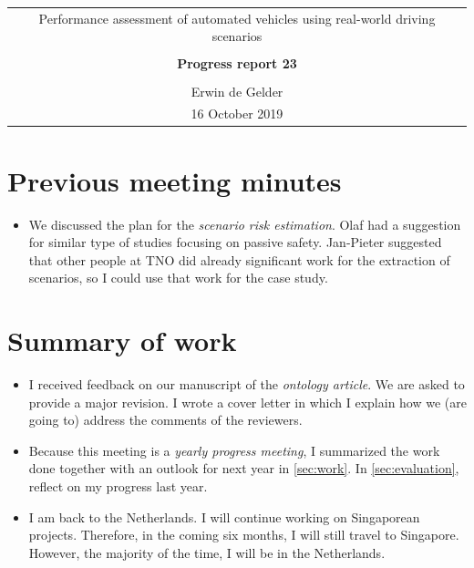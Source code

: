 \documentclass[10pt,final,a4paper,oneside,onecolumn]{article}
\newcommand{\progressreportnumber}{23}
\renewcommand{\author}{Erwin de Gelder}
\renewcommand{\date}{16 October 2019}
\renewcommand{\title}{Performance assessment of automated vehicles using real-world driving scenarios}
\begin{document}
	
\begin{center}
	\begin{tabular}{c}
		\title \\ \\
		\textbf{\huge Progress report \progressreportnumber} \\ \\
		\author \\ 
		\date
	\end{tabular}
\end{center}



\section{Previous meeting minutes}

\begin{itemize}
	\item We discussed the plan for the \emph{scenario risk estimation}. Olaf had a suggestion for similar type of studies focusing on passive safety. Jan-Pieter suggested that other people at TNO did already significant work for the extraction of scenarios, so I could use that work for the case study.
\end{itemize}



\section{Summary of work}

\begin{itemize}
	\item I received feedback on our manuscript of the \emph{ontology article}. We are asked to provide a major revision. I wrote a cover letter in which I explain how we (are going to) address the comments of the reviewers.
	
	\item Because this meeting is a \emph{yearly progress meeting}, I summarized the work done together with an outlook for next year in \cref{sec:work}. In \cref{sec:evaluation}, reflect on my progress last year.
	
	\item I am back to the Netherlands. I will continue working on Singaporean projects. Therefore, in the coming six months, I will still travel to Singapore. However, the majority of the time, I will be in the Netherlands. 
\end{itemize}
\end{document}
